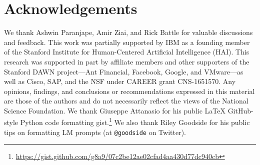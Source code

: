 \documentclass{article}
\begin{document}








\section*{Acknowledgements}

We thank Ashwin Paranjape, Amir Ziai, and Rick Battle for valuable discussions and feedback.
This work was partially supported by IBM as a founding member of the Stanford Institute for Human-Centered Artificial Intelligence (HAI). This research was supported in part by affiliate members and other supporters of the Stanford DAWN project---Ant Financial, Facebook, Google, and VMware---as well as Cisco, SAP, and the NSF under CAREER grant CNS-1651570. Any opinions, findings, and conclusions or recommendations expressed in this material are those of the authors and do not necessarily reflect the views of the National Science Foundation.
We thank Giuseppe Attanasio for his public \LaTeX{} GitHub-style Python code formatting gist.\footnote{\url{https://gist.github.com/g8a9/07c2be12ae02cfad4aa430d77dc940cb}} We also thank Riley Goodside for his public tips on formatting LM prompts (at \texttt{@goodside} on Twitter).





\appendix
\end{document}
